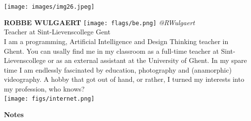 \documentclass[11pt]{article}
\begin{document}
\noindent
\begin{minipage}{0.3\textwidth}
\centering
\texttt{[image: images/img26.jpeg]}
\end{minipage}
\hfill
\begin{minipage}{0.6\textwidth}\raggedright
\color{color1}\uppercase{\textbf{Robbe Wulgaert}}
\color{color2}\hspace{0.2cm}\texttt{[image: flags/be.png]}
\hspace{0.2cm}\textit{@RWulgaert}
\\
Teacher at Sint-Lievenscollege Gent\\
{\footnotesize I am a programming, Artificial Intelligence and Design Thinking teacher in Ghent. You can usally find me in my classroom as a full-time teacher at Sint-Lievenscollege or as an external assistant at the University of Ghent. In my spare time I am endlessly fascinated by education, photography and (anamorphic) videography. A hobby that got out of hand, or rather, I turned my interests into my profession, who knows?}\\
\texttt{[image: figs/internet.png]}
\end{minipage}
\newline\newline\newline



\newpage
\begin{center}
\Huge \textbf{Notes}
\end{center}
\end{document}
